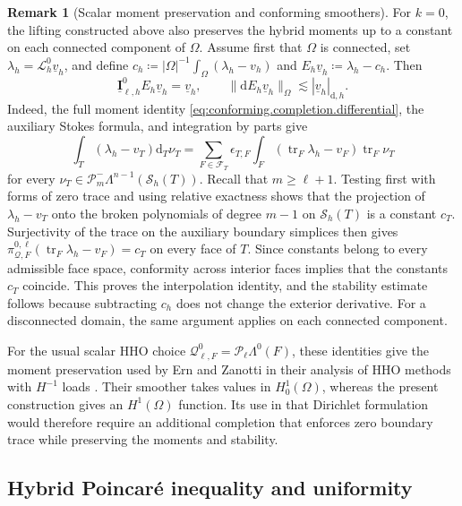 \documentclass[a4paper,11pt]{article}
\theoremstyle{definition}
\newtheorem{remark}[theorem]{Remark}
\newcommand{\DIFF}{\mathrm{d}}
\newcommand{\Sh}{\mathcal{S}_h}
\newcommand{\PL}[2]{\mathcal{P}_{#1}\Lambda^{#2}}
\newcommand{\PLtrim}[2]{\mathcal{P}_{#1}^{-}\Lambda^{#2}}
\newcommand{\uI}[2]{\underline{\boldsymbol{I}}_{\ell,#2}^{#1}}
\newcommand{\Qtrace}[2]{\mathcal Q_{\ell,#1}^{#2}}
\newcommand{\piQ}[2]{\pi_{\mathcal Q,#1}^{#2,\ell}}
\newcommand{\trc}{\operatorname{tr}}
\newcommand{\epsTF}{\epsilon_{T,F}}
\begin{document}
\begin{remark}[Scalar moment preservation and conforming smoothers]
\label{rem:scalar.moments.ern.zanotti}
For $k=0$, the lifting constructed above also preserves the hybrid moments up to a constant on each connected component of $\Omega$.
Assume first that $\Omega$ is connected, set $\lambda_h=\mathcal L_h^0\underline v_h$, and define $c_h\coloneqq |\Omega|^{-1}\int_\Omega(\lambda_h-v_h)$ and $E_h\underline v_h\coloneqq\lambda_h-c_h$.
Then
\[
  \uI{0}{h}E_h\underline v_h=\underline v_h,
  \qquad
  \|\DIFF E_h\underline v_h\|_\Omega
  \lesssim |\underline v_h|_{\DIFF,h}.
\]
Indeed, the full moment identity \eqref{eq:conforming.completion.differential}, the auxiliary Stokes formula, and integration by parts give
\[
  \int_T(\lambda_h-v_T)\DIFF_T\nu_T
  =
  \sum_{F\in\mathcal F_T}\epsTF
  \int_F(\trc_F\lambda_h-v_F)\trc_F\nu_T
\]
for every $\nu_T\in\PLtrim{m}{n-1}(\Sh(T))$.
Recall that $m\geq\ell+1$.
Testing first with forms of zero trace and using relative exactness shows that the projection of $\lambda_h-v_T$ onto the broken polynomials of degree $m-1$ on $\Sh(T)$ is a constant $c_T$.
Surjectivity of the trace on the auxiliary boundary simplices then gives $\piQ{F}{0}(\trc_F\lambda_h-v_F)=c_T$ on every face of $T$.
Since constants belong to every admissible face space, conformity across interior faces implies that the constants $c_T$ coincide.
This proves the interpolation identity, and the stability estimate follows because subtracting $c_h$ does not change the exterior derivative.
For a disconnected domain, the same argument applies on each connected component.

For the usual scalar HHO choice $\Qtrace{F}{0}=\PL{\ell}{0}(F)$, these identities give the moment preservation used by Ern and Zanotti in their analysis of HHO methods with $H^{-1}$ loads \cite[Lemma~4.4 and Proposition~4.5]{Ern.Zanotti:20:smoother}.
Their smoother takes values in $H_0^1(\Omega)$, whereas the present construction gives an $H^1(\Omega)$ function.
Its use in that Dirichlet formulation would therefore require an additional completion that enforces zero boundary trace while preserving the moments and stability.
\end{remark}

\subsection{Hybrid Poincar\'e inequality and uniformity}
\label{subsec:skeleton.interpretation.uniformity}
\end{document}
